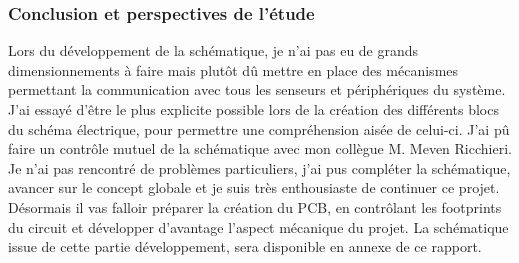 {	\clearpage
	\subsubsection{Conclusion et perspectives de l'étude} \label{sssec:conclusionEtude}
	{
		Lors du développement de la schématique, je n'ai pas eu de grands dimensionnements à faire mais plutôt dû mettre en place des mécanismes permettant la communication avec tous les senseurs et périphériques du système. J'ai essayé d'être le plus explicite possible lors de la création des différents blocs du schéma électrique, pour permettre une compréhension aisée de celui-ci. 
		J'ai pû faire un contrôle mutuel de la schématique avec mon collègue M. Meven Ricchieri.
		Je n'ai pas rencontré de problèmes particuliers, j'ai pus compléter la schématique, avancer sur le concept globale et je suis très enthousiaste de continuer ce projet.
		Désormais il vas falloir préparer la création du PCB, en contrôlant les footprints du circuit et développer d'avantage l'aspect mécanique du projet.
		La schématique issue de cette partie développement,  sera disponible en annexe de ce rapport.
		
		
	}
	

}


\clearpage